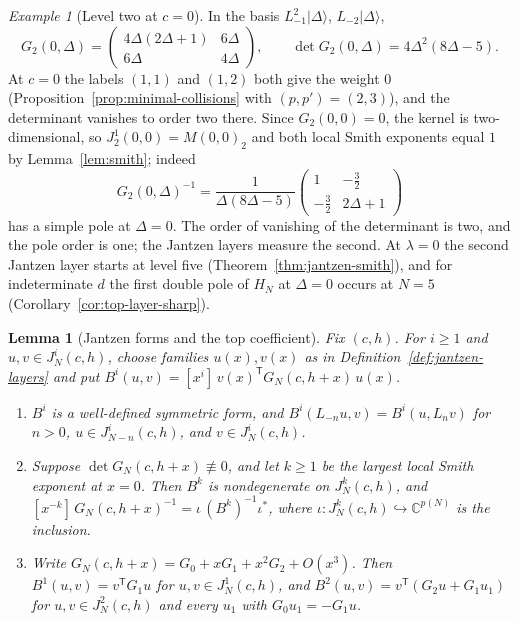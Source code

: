 \documentclass[twoside,10pt]{article}
\numberwithin{equation}{section}
\theoremstyle{slbody}
\newtheorem{lemma}[theorem]{Lemma}
\theoremstyle{definition}
\theoremstyle{remark}
\newtheorem*{example*}{Example}
\begin{document}
\begin{example*}[Level two at \(c=0\)]
In the basis \(L_{-1}^2|\Delta\rangle\), \(L_{-2}|\Delta\rangle\),
\[
 G_2(0,\Delta)=\begin{pmatrix}4\Delta(2\Delta+1)&6\Delta\\6\Delta&4\Delta\end{pmatrix},
 \qquad
 \det G_2(0,\Delta)=4\Delta^2(8\Delta-5).
\]
At \(c=0\) the labels \((1,1)\) and \((1,2)\) both give the weight \(0\)
(Proposition~\ref{prop:minimal-collisions} with \((p,p')=(2,3)\)), and the
determinant vanishes to order two there.  Since \(G_2(0,0)=0\), the kernel is
two-dimensional, so \(J^1_2(0,0)=M(0,0)_2\) and both local Smith exponents
equal \(1\) by Lemma~\ref{lem:smith}; indeed
\[
 G_2(0,\Delta)^{-1}
 =\frac{1}{\Delta(8\Delta-5)}
  \begin{pmatrix}1&-\tfrac32\\-\tfrac32&2\Delta+1\end{pmatrix}
\]
has a simple pole at \(\Delta=0\).  The order of vanishing of the determinant
is two, and the pole order is one; the Jantzen layers measure the second.  At
\(\lambda=0\) the second Jantzen layer starts at level five
(Theorem~\ref{thm:jantzen-smith}), and for indeterminate \(d\) the first
double pole of \(H_N\) at \(\Delta=0\) occurs at \(N=5\)
(Corollary~\ref{cor:top-layer-sharp}).
\end{example*}


\begin{lemma}[Jantzen forms and the top coefficient]
\label{lem:top-coefficient}
Fix \((c,h)\).  For \(i\geq1\) and \(u,v\in J^i_N(c,h)\), choose families
\(u(x),v(x)\) as in Definition~\ref{def:jantzen-layers} and put
\(B^i(u,v)=[x^i]\,v(x)^{\mathsf T}G_N(c,h+x)\,u(x)\).
\begin{enumerate}
\item[(i)] \(B^i\) is a well-defined symmetric form, and
\(B^i(L_{-n}u,v)=B^i(u,L_nv)\) for \(n>0\), \(u\in J^i_{N-n}(c,h)\), and
\(v\in J^i_N(c,h)\).
\item[(ii)] Suppose \(\det G_N(c,h+x)\not\equiv0\), and let \(k\geq1\) be
the largest local Smith exponent at \(x=0\).  Then \(B^k\) is
nondegenerate on \(J^k_N(c,h)\), and
\([x^{-k}]\,G_N(c,h+x)^{-1}=\iota\,(B^k)^{-1}\iota^*\),
where \(\iota\colon J^k_N(c,h)\hookrightarrow\mathbb C^{p(N)}\) is the
inclusion.
\item[(iii)] Write \(G_N(c,h+x)=G_0+xG_1+x^2G_2+O(x^3)\).  Then
\(B^1(u,v)=v^{\mathsf T}G_1u\) for \(u,v\in J^1_N(c,h)\), and
\(B^2(u,v)=v^{\mathsf T}(G_2u+G_1u_1)\) for \(u,v\in J^2_N(c,h)\) and every
\(u_1\) with \(G_0u_1=-G_1u\).
\end{enumerate}
\end{lemma}
\end{document}
